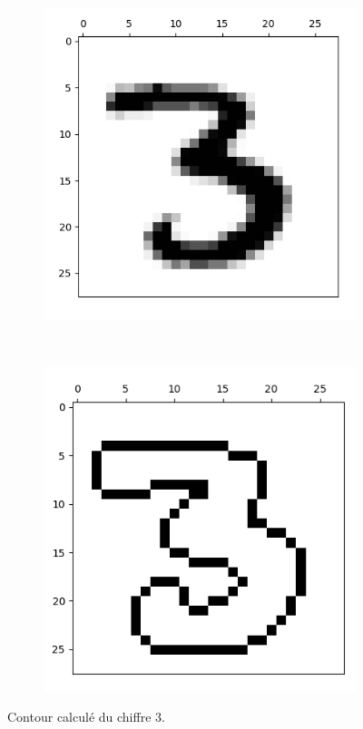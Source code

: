 \begin{figure}[h!]
    \centering
    \begin{subfigure}[b]{0.4\textwidth}
        \centering
        \includegraphics[scale=0.45]{assets/training-image-12}
    \end{subfigure}%
    ~ 
    \begin{subfigure}[b]{0.4\textwidth}
        \centering
        \includegraphics[scale=0.45]{assets/training-image-12-contour}
    \end{subfigure}
    \caption{Contour calculé du chiffre 3.}
\end{figure}

